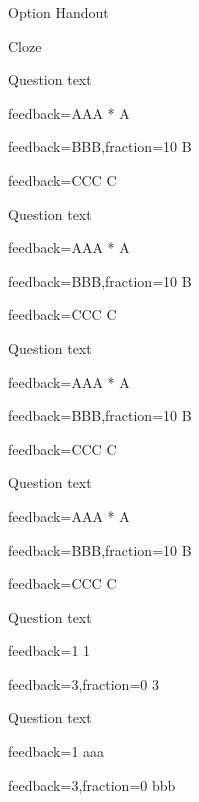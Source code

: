 \documentclass{article}
\begin{document}
\begin{quiz}[points=1.0,tags={tag},feedback={General feedback},shuffle]{ Option 
Handout}
\begin{cloze}{Cloze}
\begin{multi}[inline,shuffle=false]
Question text
\item[feedback={AAA}]* A
\item[feedback={BBB},fraction=10] B
\item[feedback={CCC}] C
\end{multi}

\begin{multi}[horizontal]
Question text
\item[feedback={AAA}]* A
\item[feedback={BBB},fraction=10] B
\item[feedback={CCC}] C
\end{multi}

\begin{multi}[vertical]
Question text
\item[feedback={AAA}]* A
\item[feedback={BBB},fraction=10] B
\item[feedback={CCC}] C
\end{multi}

\begin{multi}[inline]
Question text
\item[feedback={AAA}]* A
\item[feedback={BBB},fraction=10] B
\item[feedback={CCC}] C
\end{multi}

\begin{numerical}[tolerance=1]
Question text
\item[feedback={1}] 1
\item[feedback={3},fraction=0] 3
\end{numerical}

\begin{shortanswer}[tolerance=1]
Question text
\item[feedback={1}] aaa
\item[feedback={3},fraction=0] bbb
\end{shortanswer}

\end{cloze}

\end{quiz}
\end{document}
